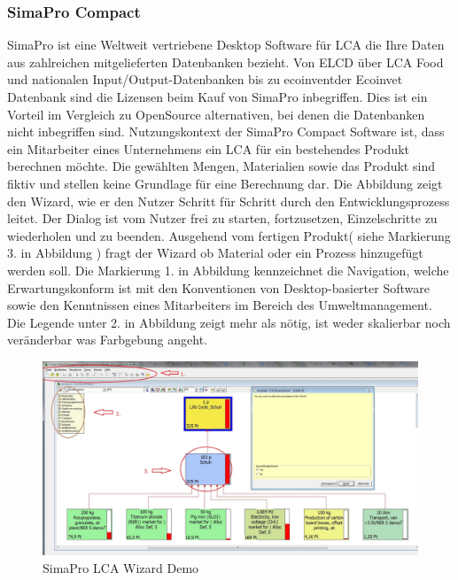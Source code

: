 \documentclass[a4paper, 12pt, twoside, BCOR=20mm, DIV=calc, abstracton, parskip=half*, toc=bibliography, toc=listof, headsepline, footsepline, headings=small, numbers=enddot]{scrreprt}
\begin{document}
\subsubsection{SimaPro Compact}
SimaPro ist eine Weltweit vertriebene Desktop Software für \ac{LCA} die Ihre Daten aus zahlreichen mitgelieferten Datenbanken bezieht. Von ELCD über LCA Food und nationalen Input/Output-Datenbanken bis zu ecoinventder Ecoinvet Datenbank sind die Lizensen beim Kauf von SimaPro inbegriffen\cite{SimaPro_Homepage}. Dies ist ein Vorteil im Vergleich zu OpenSource alternativen, bei denen die Datenbanken nicht inbegriffen sind. 
Nutzungskontext der SimaPro Compact Software ist, dass ein Mitarbeiter eines Unternehmens ein \ac{LCA} für ein bestehendes Produkt berechnen möchte. Die gewählten Mengen, Materialien sowie das Produkt sind fiktiv und stellen keine Grundlage für eine Berechnung dar. Die Abbildung zeigt den Wizard, wie er den Nutzer Schritt für Schritt durch den Entwicklungsprozess leitet. Der Dialog ist vom Nutzer frei zu starten, fortzusetzen, Einzelschritte zu wiederholen und zu beenden. Ausgehend vom fertigen Produkt( siehe Markierung 3. in Abbildung ) fragt der Wizard ob Material oder ein Prozess hinzugefügt werden soll.  
Die Markierung 1. in Abbildung  kennzeichnet die Navigation, welche Erwartungskonform ist mit den Konventionen von Desktop-basierter Software sowie den Kenntnissen eines Mitarbeiters im Bereich des Umweltmanagement. Die Legende unter 2. in Abbildung zeigt mehr als nötig, ist weder skalierbar noch veränderbar was Farbgebung angeht.  
\begin{figure}[h!]
\centering
\includegraphics[width=\textwidth]{Bild/SimaPro LCA Demo Material Process.JPG}
\caption{SimaPro LCA Wizard Demo}
\end{figure}
\end{document}
